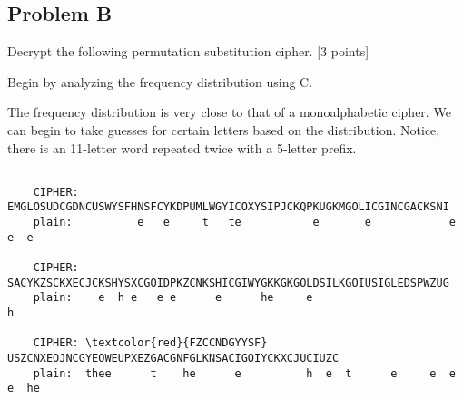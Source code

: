 \documentclass[../hw_sols.tex]{subfiles}
\begin{document}
\subsection*{Problem B}

Decrypt the following permutation substitution cipher. [3 points]


\begin{solution}

Begin by analyzing the frequency distribution using C.




The frequency distribution is very close to that of a monoalphabetic cipher. 
We can begin to take guesses for certain letters based on the distribution. 
Notice, there is an 11-letter word repeated twice with a 5-letter prefix.

\begin{BVerbatim}[commandchars=\\\{\}]

    CIPHER: EMGLOSUDCGDNCUSWYSFHNSFCYKDPUMLWGYICOXYSIPJCKQPKUGKMGOLICGINCGACKSNI
    plain:          e   e     t   te           e       e            e   e  e

    CIPHER: SACYKZSCKXECJCKSHYSXCGOIDPKZCNKSHICGIWYGKKGKGOLDSILKGOIUSIGLEDSPWZUG
    plain:    e  h e   e e      e      he     e                              h

    CIPHER: \textcolor{red}{FZCCNDGYYSF}  USZCNXEOJNCGYEOWEUPXEZGACGNFGLKNSACIGOIYCKXCJUCIUZC
    plain:  thee      t    he      e          h  e  t      e     e  e  e  he


\end{BVerbatim}
\end{solution}
\end{document}
